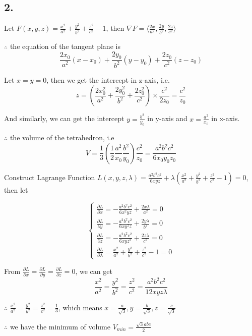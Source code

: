 \documentclass{article}
\begin{document}
  \subsection*{2. }

  Let $F(x, y, z) = \frac{x^2}{a^2} + \frac{y^2}{b^2} + \frac{z^2}{c^2} - 1$, then $\nabla F = \langle \frac{2x}{a^2}, \frac{2y}{b^2}, \frac{2z}{c^2} \rangle$

  $\therefore$ the equation of the tangent plane is $$\frac{2x_0}{a^2}(x-x_0) + \frac{2y_0}{b^2}(y-y_0) + \frac{2z_0}{c^2}(z-z_0)$$

  Let $x = y = 0$, then we get the intercept in z-axis, i.e. $$z = (\frac{2x_0^2}{a^2} + \frac{2y_0^2}{b^2} + \frac{2z_0^2}{c^2}) \times \frac{c^2}{2z_0} = \frac{c^2}{z_0}$$

  And similarly, we can get the intercept $y = \frac{b^2}{y_0}$ in y-axis and $x = \frac{a^2}{x_0}$ in x-axis.

  $\therefore$ the volume of the tetrahedron, i.e $$V = \frac 1 3 (\frac 1 2 \frac{a^2}{x_0} \frac{b^2}{y_0}) \frac{c^2}{z_0} = \frac{a^2b^2c^2}{6x_0y_0z_0}$$

  Construct Lagrange Function $L(x, y, z, \lambda) = \frac{a^2b^2c^2}{6xyz} + \lambda (\frac{x^2}{a^2} + \frac{y^2}{b^2} + \frac{z^2}{c^2} - 1) = 0$, then let

  $$\left\{ \begin{array}{ll} 
    \frac{\partial L}{\partial x} = -\frac{a^2b^2c^2}{6x^2yz} + \frac{2x\lambda}{a^2} = 0 \\
    \frac{\partial L}{\partial y} = -\frac{a^2b^2c^2}{6xy^2z} + \frac{2y\lambda}{b^2} = 0 \\
    \frac{\partial L}{\partial z} = -\frac{a^2b^2c^2}{6xyz^2} + \frac{2z\lambda}{c^2} = 0 \\
    \frac{\partial L}{\partial \lambda} = \frac{x^2}{a^2} + \frac{y^2}{b^2} + \frac{z^2}{c^2} - 1 = 0
  \end{array}\right.$$

  From $\frac{\partial L}{\partial x} = \frac{\partial L}{\partial y} = \frac{\partial L}{\partial z} = 0$, we can get $$\frac{x^2}{a^2} = \frac{y^2}{b^2} = \frac{z^2}{c^2} = \frac{a^2b^2c^2}{12xyz\lambda}$$

  $\therefore$ $\frac{x^2}{a^2} = \frac{y^2}{b^2} = \frac{z^2}{c^2} = \frac 1 3$, which means $x = \frac{a}{\sqrt 3}, y = \frac{b}{\sqrt 3}, z = \frac{c}{\sqrt 3}$

  $\therefore$ we have the minimum of volume $V_{min} = \frac{\sqrt 3abc}{2}$
\end{document}
